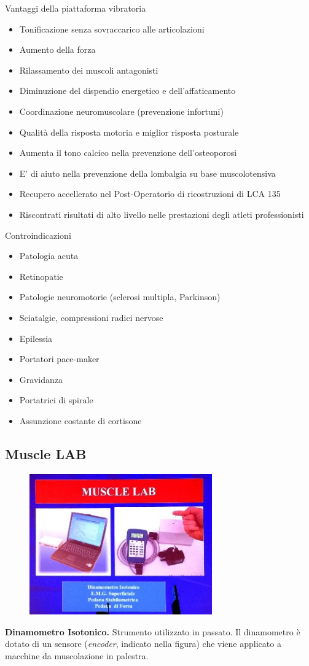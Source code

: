 Vantaggi della piattaforma vibratoria
\begin{itemize}
\item 
Tonificazione senza sovraccarico alle articolazioni
\item 
Aumento della forza
\item 
Rilassamento dei muscoli antagonisti
\item 
Diminuzione del dispendio energetico e dell'affaticamento
\item 
Coordinazione neuromuscolare (prevenzione infortuni)
\item 
Qualità della risposta motoria e miglior risposta posturale
\item 
Aumenta il tono calcico nella prevenzione dell'osteoporosi
\item 
E' di aiuto nella prevenzione della lombalgia su base muscolotensiva
\item 
Recupero accellerato nel Post-Operatorio di ricostruzioni di LCA 135
\item 
Riscontrati risultati di alto livello nelle prestazioni degli atleti
professionisti
\end{itemize}
Controindicazioni
\begin{itemize}
\item 
 Patologia acuta
\item 
 Retinopatie
\item 
 Patologie neuromotorie (sclerosi multipla, Parkinson)
\item 
 Sciatalgie, compressioni radici nervose
\item 
 Epilessia
\item 
 Portatori pace-maker
\item 
 Gravidanza
\item 
 Portatrici di spirale
\item 
 Assunzione costante di cortisone
\end{itemize}


\subsection{Muscle LAB}

\begin{figure}[!ht]
\centering
	\includegraphics[width=0.7\textwidth]{030/image9.jpeg}
\end{figure}
\textbf{Dinamometro Isotonico.} Strumento utilizzato in passato. Il
dinamometro è dotato di un sensore (\emph{encoder}, indicato nella
figura) che viene applicato a macchine da muscolazione in palestra.

